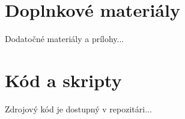 \section{Doplnkové materiály}

Dodatočné materiály a prílohy...

\section{Kód a skripty}

Zdrojový kód je dostupný v repozitári...
